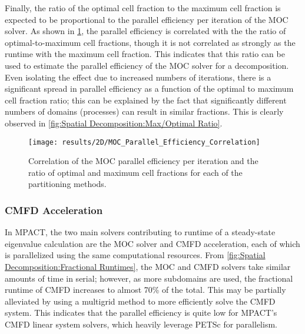 {{{{        Finally, the ratio of the optimal cell fraction to the maximum cell fraction is expected to be proportional to the parallel efficiency per iteration of the \ac{MOC} solver.
        As shown in \cref{fig:Spatial Decomposition:MOC Parallel Efficiency Correlation}, the parallel efficiency is correlated with the the ratio of optimal-to-maximum cell fractions, though it is not correlated as strongly as the runtime with the maximum cell fraction.
        This indicates that this ratio can be used to estimate the parallel efficiency of the \ac{MOC} solver for a decomposition.
        Even isolating the effect due to increased numbers of iterations, there is a significant spread in parallel efficiency as a function of the optimal to maximum cell fraction ratio; this can be explained by the fact that significantly different numbers of domains (processes) can result in similar fractions.
        This is clearly observed in \cref{fig:Spatial Decomposition:Max/Optimal Ratio}.

        \begin{figure}
          \centering
          \texttt{[image: results/2D/MOC\_Parallel\_Efficiency\_Correlation]}
          \caption{Correlation of the \ac{MOC} parallel efficiency per iteration and the ratio of optimal and maximum cell fractions for each of the partitioning methods. \label{fig:Spatial Decomposition:MOC Parallel Efficiency Correlation}}
        \end{figure}
      }
      \subsubsection{CMFD Acceleration}{\label{sssec:CMFD Acceleration}
        In MPACT, the two main solvers contributing to runtime of a steady-state eigenvalue calculation are the \ac{MOC} solver and \ac{CMFD} acceleration, each of which is parallelized using the same computational resources.
        From \cref{fig:Spatial Decomposition:Fractional Runtimes}, the \ac{MOC} and \ac{CMFD} solvers take similar amounts of time in serial; however, as more subdomains are used, the fractional runtime of \ac{CMFD} increases to almost 70\% of the total.
        This may be partially alleviated by using a multigrid method \cite{Yee2018} to more efficiently solve the \ac{CMFD} system.
        This indicates that the parallel efficiency is quite low for MPACT's \ac{CMFD} linear system solvers, which heavily leverage PETSc \cite{Petsc} for parallelism.

}}}}

